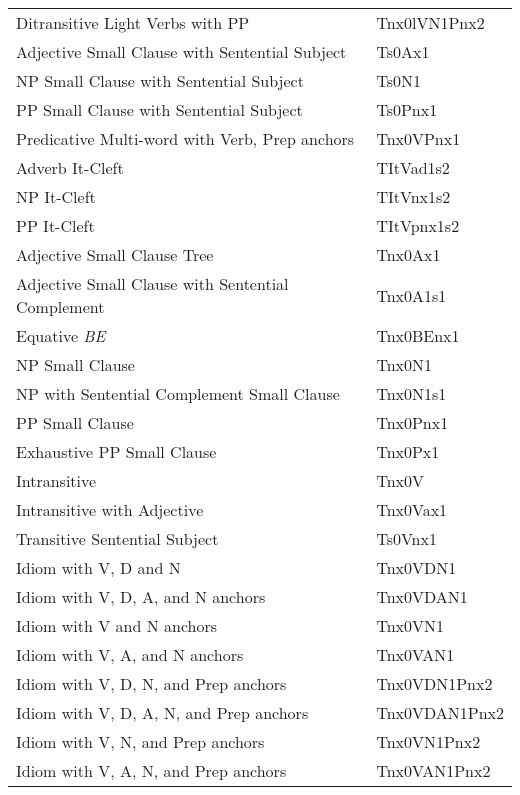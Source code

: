 \begin{tabular}{ll}
Ditransitive Light Verbs with PP & Tnx0lVN1Pnx2\\
Adjective Small Clause with Sentential Subject & Ts0Ax1\\
NP Small Clause with Sentential Subject &  Ts0N1\\
PP Small Clause with Sentential Subject & Ts0Pnx1\\
Predicative Multi-word with Verb, Prep anchors & Tnx0VPnx1\\
Adverb It-Cleft & TItVad1s2\\
NP It-Cleft & TItVnx1s2\\
PP It-Cleft & TItVpnx1s2\\
Adjective Small Clause Tree & Tnx0Ax1\\
Adjective Small Clause with Sentential Complement & Tnx0A1s1\\
Equative {\it BE} & Tnx0BEnx1\\
NP Small Clause & Tnx0N1\\
NP with Sentential Complement Small Clause & Tnx0N1s1\\
PP Small Clause & Tnx0Pnx1\\
Exhaustive PP Small Clause & Tnx0Px1\\
Intransitive & Tnx0V\\
Intransitive with Adjective & Tnx0Vax1\\
Transitive Sentential Subject &  Ts0Vnx1\\
Idiom with V, D and N & Tnx0VDN1\\
Idiom with V, D, A, and N anchors & Tnx0VDAN1\\
Idiom with V and N anchors & Tnx0VN1\\
Idiom with V, A, and N anchors & Tnx0VAN1\\
Idiom with V, D, N, and Prep anchors & Tnx0VDN1Pnx2\\
Idiom with V, D, A, N, and Prep anchors & Tnx0VDAN1Pnx2\\
Idiom with V, N, and Prep anchors & Tnx0VN1Pnx2\\
Idiom with V, A, N, and Prep anchors & Tnx0VAN1Pnx2
\end{tabular}
\normalsize

\clearpage















